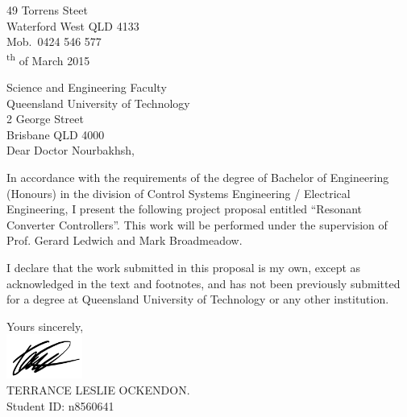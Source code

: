 \begin{flushright}
	49 Torrens Steet\\
	Waterford West QLD 4133\\
	Mob.\ 0424 546 577\\
	\textsuperscript{th} of March 2015
\end{flushright}
\begin{flushleft}
  Science and Engineering Faculty\\
  Queensland University of Technology\\
  2 George Street\\
  Brisbane QLD 4000\\
  \bigskip\bigskip
  Dear Doctor Nourbakhsh,
\end{flushleft}

In accordance with the requirements of the degree of Bachelor of
Engineering (Honours) in the division of Control Systems
Engineering / Electrical Engineering, I present the
following project proposal entitled ``Resonant Converter Controllers''.  This work will be performed under the supervision of
Prof. Gerard Ledwich and Mark Broadmeadow.

I declare that the work submitted in this proposal is my own, except as
acknowledged in the text and footnotes, and has not been previously
submitted for a degree at Queensland University of Technology or any other institution.

\begin{flushright}
	Yours sincerely,\\
	\medskip
	\includegraphics[width=2.5cm,keepaspectratio]{fig/sig.PNG}\\
    \medskip
	TERRANCE LESLIE OCKENDON.\\
	Student ID: n8560641
\end{flushright}